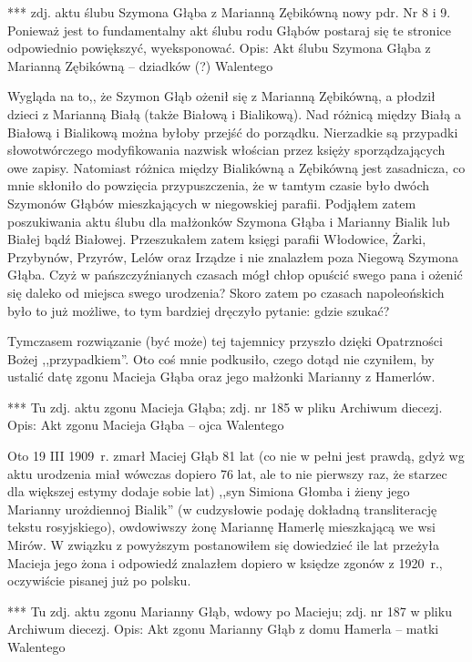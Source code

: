 {\color{red}
*** zdj. aktu ślubu Szymona Głąba z Marianną Zębikówną  nowy pdr. Nr 8 i 9. Ponieważ jest to fundamentalny akt ślubu rodu Głąbów postaraj się te stronice odpowiednio powiększyć, wyeksponować.
Opis: Akt ślubu Szymona Głąba z Marianną Zębikówną -- dziadków (?) Walentego }

Wygląda na to,, że Szymon Głąb ożenił się z Marianną Zębikówną, a płodził dzieci z Marianną Białą (także Białową i Bialikową). Nad różnicą między Białą a Białową i Bialikową można byłoby przejść do porządku. Nierzadkie są przypadki słowotwórczego modyfikowania nazwisk włościan przez księży sporządzających owe zapisy. Natomiast różnica między Bialikówną a Zębikówną jest zasadnicza, co mnie skłoniło do powzięcia przypuszczenia, że w tamtym czasie było dwóch Szymonów Głąbów mieszkających w niegowskiej parafii. Podjąłem zatem poszukiwania aktu ślubu dla małżonków Szymona Głąba i Marianny Bialik lub Białej bądź Białowej. Przeszukałem zatem księgi parafii Włodowice, Żarki, Przybynów, Przyrów, Lelów oraz Irządze i nie znalazłem poza Niegową Szymona Głąba. Czyż w pańszczyźnianych czasach mógł chłop opuścić swego pana i ożenić się daleko od miejsca swego urodzenia? Skoro zatem po czasach napoleońskich było to już możliwe, to tym bardziej dręczyło pytanie: gdzie szukać? 

Tymczasem rozwiązanie (być może) tej tajemnicy przyszło dzięki Opatrzności Bożej ,,przypadkiem''. Oto coś mnie podkusiło, czego dotąd nie czyniłem, by ustalić datę zgonu Macieja Głąba oraz jego małżonki Marianny z Hamerlów.

{\color{red}
*** Tu zdj. aktu zgonu Macieja Głąba; zdj. nr 185 w pliku Archiwum diecezj.
Opis: Akt zgonu Macieja Głąba -- ojca Walentego }

Oto 19 III 1909~r. zmarł Maciej Głąb 81 lat (co nie w pełni jest prawdą, gdyż wg aktu urodzenia miał wówczas dopiero 76 lat, ale to nie pierwszy raz, że starzec dla większej estymy dodaje sobie lat) ,,syn Simiona Głomba i żieny jego Marianny urożdiennoj Bialik'' (w cudzysłowie podaję dokładną transliterację tekstu rosyjskiego), owdowiwszy żonę Mariannę Hamerlę mieszkającą we wsi Mirów.
W związku z powyższym postanowiłem się dowiedzieć ile lat przeżyła Macieja jego żona i odpowiedź znalazłem dopiero w księdze zgonów z 1920~r., oczywiście pisanej już po polsku.

{\color{red}
*** Tu zdj. aktu zgonu Marianny Głąb, wdowy po Macieju; zdj. nr 187 w pliku Archiwum diecezj.
Opis: Akt zgonu Marianny Głąb z domu Hamerla -- matki Walentego }

